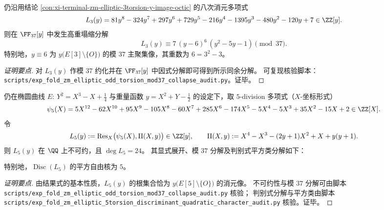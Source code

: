 \begin{conclusion}\label{con:xi-terminal-zm-elliptic-3torsion-y-image-mod37-collapse}
仍沿用结论 \ref{con:xi-terminal-zm-elliptic-3torsion-y-image-octic} 的八次消元多项式
\[
L_{3}(y)=81 y^{8}-324 y^{7}+297 y^{6}+729 y^{5}-216 y^{4}-1395 y^{3}-480 y^{2}-120 y+7\in\ZZ[y].
\]
则在 \(\FF_{37}[y]\) 中发生高重塌缩分解
\[
L_{3}(y)\equiv 7\,(y-6)^{6}\,(y^{2}-5y-1)\pmod{37}.
\]
特别地，\(y\equiv 6\) 为 \(y\bigl(E[3]\setminus\{O\}\bigr)\) 的模 \(37\) 主聚集像，其重数为 \(6=3^{2}-3\)。
\end{conclusion}
\begin{proof}[证明要点]
对 \(L_{3}(y)\) 作模 \(37\) 约化并在 \(\FF_{37}[y]\) 中因式分解即可得到所示同余分解。
可复现核验脚本：\texttt{scripts/exp\_fold\_zm\_elliptic\_odd\_torsion\_mod37\_collapse\_audit.py}。证毕。
\end{proof}

\begin{conclusion}\label{con:xi-terminal-zm-elliptic-5torsion-y-image-degree24-mod37-collapse}
仍在椭圆曲线
\(
E:\ Y^{2}=X^{3}-X+\tfrac14
\)
与重量函数
\(
y=X^{2}+Y-\tfrac12
\)
的设定下，取 \(5\)-division 多项式（\(X\)-坐标形式）
\[
\psi_{5}(X)=5X^{12}-62X^{10}+95X^{9}-105X^{8}-60X^{7}+285X^{6}-174X^{5}-5X^{4}-5X^{3}+35X^{2}-15X+2\in\ZZ[X].
\]
令
\[
L_{5}(y):=\operatorname{Res}_{X}\bigl(\psi_{5}(X),\Pi(X,y)\bigr)\in\ZZ[y],
\qquad
\Pi(X,y):=X^{4}-X^{3}-(2y+1)X^{2}+X+y(y+1).
\]
则 \(L_{5}(y)\) 在 \(\QQ\) 上不可约，且 \(\deg L_{5}=24\)。
其显式展开、模 \(37\) 分解及判别式平方类分解如下：

特别地，\(\operatorname{Disc}(L_5)\) 的平方自由核为 \(5\)。
\end{conclusion}
\begin{proof}[证明要点]
由结果式的基本性质，\(L_{5}(y)\) 的根集合恰为 \(y\bigl(E[5]\setminus\{O\}\bigr)\) 的消元像。
不可约性与模 \(37\) 分解可由脚本 \texttt{scripts/exp\_fold\_zm\_elliptic\_odd\_torsion\_mod37\_collapse\_audit.py} 核验；
判别式分解与平方类由脚本 \texttt{scripts/exp\_fold\_zm\_elliptic\_5torsion\_discriminant\_quadratic\_character\_audit.py} 核验。证毕。
\end{proof}

